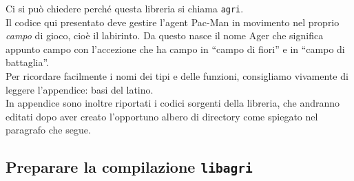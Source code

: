 \documentclass[8pt]{book}
\begin{document}
Ci si può chiedere perché questa libreria si chiama \texttt{agri}.\\
Il codice qui presentato deve gestire l'agent Pac-Man in movimento nel proprio \emph{campo} di gioco, cioè il labirinto. Da questo nasce il nome Ager che significa appunto campo con l'accezione che ha campo in ``campo di fiori'' e in ``campo di battaglia''.\\
Per ricordare facilmente i nomi dei tipi e delle funzioni, consigliamo vivamente di leggere l'appendice: basi del latino.\\
In appendice sono inoltre riportati i codici sorgenti della libreria, che andranno editati dopo aver creato l'opportuno albero di directory come spiegato nel paragrafo che segue.

\subsection{Preparare la compilazione \texttt{libagri}}
\end{document}

